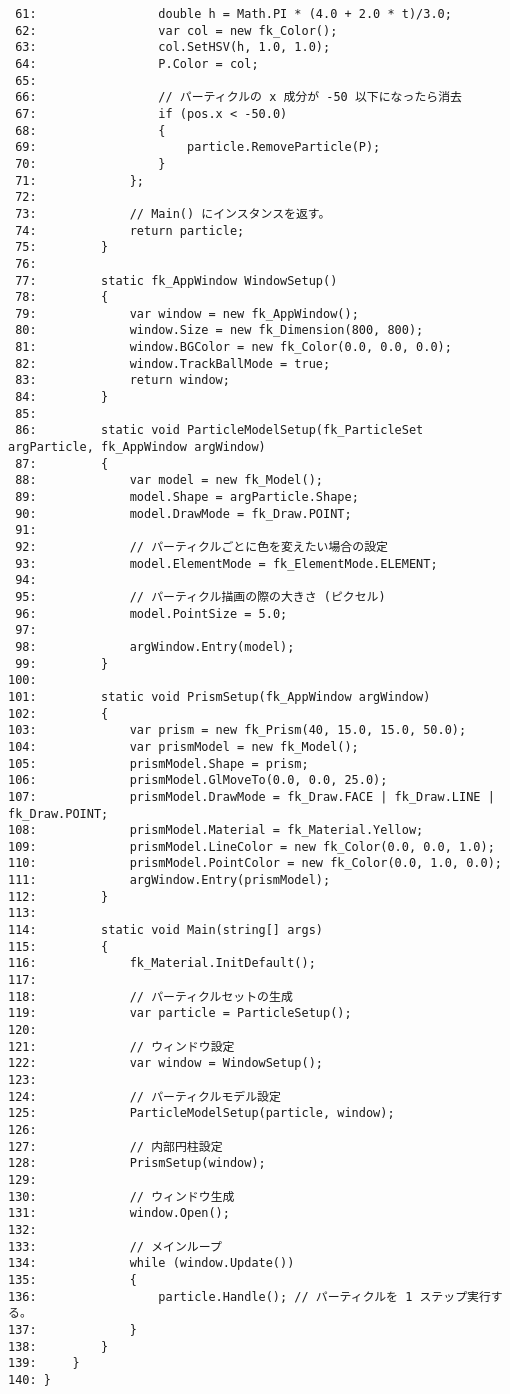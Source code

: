 \begin{breakbox}
\begin{small}
\begin{verbatim}
 61:                 double h = Math.PI * (4.0 + 2.0 * t)/3.0;
 62:                 var col = new fk_Color();
 63:                 col.SetHSV(h, 1.0, 1.0);
 64:                 P.Color = col;
 65: 
 66:                 // パーティクルの x 成分が -50 以下になったら消去
 67:                 if (pos.x < -50.0)
 68:                 {
 69:                     particle.RemoveParticle(P);
 70:                 }
 71:             };
 72: 
 73:             // Main() にインスタンスを返す。
 74:             return particle;
 75:         }
 76: 
 77:         static fk_AppWindow WindowSetup()
 78:         {
 79:             var window = new fk_AppWindow();
 80:             window.Size = new fk_Dimension(800, 800);
 81:             window.BGColor = new fk_Color(0.0, 0.0, 0.0);
 82:             window.TrackBallMode = true;
 83:             return window;
 84:         }
 85: 
 86:         static void ParticleModelSetup(fk_ParticleSet argParticle, fk_AppWindow argWindow)
 87:         {
 88:             var model = new fk_Model();
 89:             model.Shape = argParticle.Shape;
 90:             model.DrawMode = fk_Draw.POINT;
 91: 
 92:             // パーティクルごとに色を変えたい場合の設定
 93:             model.ElementMode = fk_ElementMode.ELEMENT;
 94: 
 95:             // パーティクル描画の際の大きさ (ピクセル)
 96:             model.PointSize = 5.0;
 97: 
 98:             argWindow.Entry(model);
 99:         }
100: 
101:         static void PrismSetup(fk_AppWindow argWindow)
102:         {
103:             var prism = new fk_Prism(40, 15.0, 15.0, 50.0);
104:             var prismModel = new fk_Model();
105:             prismModel.Shape = prism;
106:             prismModel.GlMoveTo(0.0, 0.0, 25.0);
107:             prismModel.DrawMode = fk_Draw.FACE | fk_Draw.LINE | fk_Draw.POINT;
108:             prismModel.Material = fk_Material.Yellow;
109:             prismModel.LineColor = new fk_Color(0.0, 0.0, 1.0);
110:             prismModel.PointColor = new fk_Color(0.0, 1.0, 0.0);
111:             argWindow.Entry(prismModel);
112:         }
113: 
114:         static void Main(string[] args)
115:         {
116:             fk_Material.InitDefault();
117: 
118:             // パーティクルセットの生成
119:             var particle = ParticleSetup();
120: 
121:             // ウィンドウ設定
122:             var window = WindowSetup();
123: 
124:             // パーティクルモデル設定
125:             ParticleModelSetup(particle, window);
126: 
127:             // 内部円柱設定
128:             PrismSetup(window);
129: 
130:             // ウィンドウ生成
131:             window.Open();
132: 
133:             // メインループ
134:             while (window.Update())
135:             {
136:                 particle.Handle(); // パーティクルを 1 ステップ実行する。
137:             }
138:         }
139:     }
140: }
\end{verbatim}
\end{small}
\end{breakbox}

